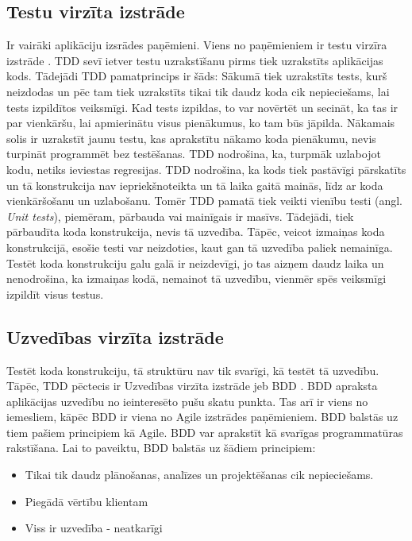 
\subsection{Testu virzīta izstrāde}
Ir vairāki aplikāciju izsrādes paņēmieni. Viens no paņēmieniem ir testu virzīra izstrāde . TDD sevī ietver testu uzrakstīšanu pirms tiek uzrakstīts aplikācijas kods. Tādejādi TDD pamatprincips ir šāds: Sākumā tiek uzrakstīts tests, kurš neizdodas un pēc tam tiek uzrakstīts tikai tik daudz koda cik nepieciešams, lai tests izpildītos veiksmīgi. Kad tests izpildas, to var novērtēt un secināt, ka tas ir par vienkāršu, lai apmierinātu visus pienākumus, ko tam būs jāpilda. Nākamais solis ir uzrakstīt jaunu testu, kas aprakstītu nākamo koda pienākumu, nevis turpināt programmēt bez testēšanas. TDD nodrošina, ka, turpmāk uzlabojot kodu, netiks ieviestas regresijas. TDD nodrošina, ka kods tiek pastāvīgi pārskatīts un tā konstrukcija nav iepriekšnoteikta un tā laika gaitā mainās, līdz ar koda vienkāršošanu un uzlabošanu.
Tomēr TDD pamatā tiek veikti vienību testi (angl. \textit{Unit tests}), piemēram, pārbauda vai mainīgais ir masīvs. Tādejādi, tiek pārbaudīta koda konstrukcija, nevis tā uzvedība. Tāpēc, veicot izmaiņas koda konstrukcijā, esošie testi var neizdoties, kaut gan tā uzvedība paliek nemainīga. \cite{chelimsky2010Rspec} Testēt koda konstrukciju galu galā ir neizdevīgi, jo tas aizņem daudz laika un nenodrošina, ka izmaiņas kodā, nemainot tā uzvedību, vienmēr spēs veiksmīgi izpildīt visus testus.

\subsection{Uzvedības virzīta izstrāde}
Testēt koda konstrukciju, tā struktūru nav tik svarīgi, kā testēt tā uzvedību. Tāpēc, TDD pēctecis ir Uzvedības virzīta izstrāde jeb BDD . BDD apraksta aplikācijas uzvedību no ieinteresēto pušu skatu punkta. Tas arī ir viens no iemesliem, kāpēc BDD ir viena no Agile izstrādes paņēmieniem. BDD balstās uz tiem pašiem principiem kā Agile.
BDD var aprakstīt kā svarīgas programmatūras rakstīšana. Lai to paveiktu, BDD balstās uz šādiem principiem:
\begin{itemize}
	\item Tikai tik daudz plānošanas, analīzes un projektēšanas cik nepieciešams.
	\item Piegādā vērtību klientam
	\item Viss ir uzvedība - neatkarīgi
\end{itemize}
\cite{chelimsky2010Rspec}

